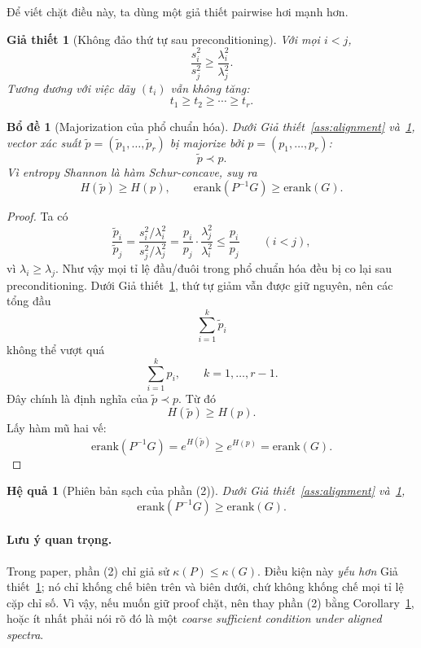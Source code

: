 \documentclass[11pt,a4paper]{article}
\newtheorem{lemma}{Bổ đề}
\newtheorem{assumption}{Giả thiết}
\newtheorem{corollary}{Hệ quả}
\newcommand{\erank}{\mathrm{erank}}
\begin{document}
\noindent
Để viết chặt điều này, ta dùng một giả thiết pairwise hơi mạnh hơn.

\begin{assumption}[Không đảo thứ tự sau preconditioning]
\label{ass:no-reorder}
Với mọi $i<j$,
\[
\frac{s_i^2}{s_j^2}\ge \frac{\lambda_i^2}{\lambda_j^2}.
\]
Tương đương với việc dãy $(t_i)$ vẫn không tăng:
\[
t_1\ge t_2\ge \cdots\ge t_r.
\]
\end{assumption}

\begin{lemma}[Majorization của phổ chuẩn hóa]
\label{lem:maj}
Dưới Giả thiết~\ref{ass:alignment} và~\ref{ass:no-reorder}, vector xác suất
$\tilde p=(\tilde p_1,\dots,\tilde p_r)$ bị majorize bởi $p=(p_1,\dots,p_r)$:
\[
\tilde p \prec p.
\]
Vì entropy Shannon là hàm Schur-concave, suy ra
\[
H(\tilde p)\ge H(p),
\qquad
\erank(P^{-1}G)\ge \erank(G).
\]
\end{lemma}

\begin{proof}
Ta có
\[
\frac{\tilde p_i}{\tilde p_j}
=
\frac{s_i^2/\lambda_i^2}{s_j^2/\lambda_j^2}
=
\frac{p_i}{p_j}\cdot \frac{\lambda_j^2}{\lambda_i^2}
\le
\frac{p_i}{p_j}
\qquad (i<j),
\]
vì $\lambda_i\ge \lambda_j$. Như vậy mọi tỉ lệ đầu/đuôi trong phổ chuẩn hóa đều bị co lại sau preconditioning. Dưới Giả thiết~\ref{ass:no-reorder}, thứ tự giảm vẫn được giữ nguyên, nên các tổng đầu
\[
\sum_{i=1}^k \tilde p_i
\]
không thể vượt quá
\[
\sum_{i=1}^k p_i,
\qquad k=1,\dots,r-1.
\]
Đây chính là định nghĩa của $\tilde p\prec p$. Từ đó
\[
H(\tilde p)\ge H(p).
\]
Lấy hàm mũ hai vế:
\[
\erank(P^{-1}G)=e^{H(\tilde p)}\ge e^{H(p)}=\erank(G).
\]
\end{proof}

\begin{corollary}[Phiên bản sạch của phần (2)]
\label{cor:part2}
Dưới Giả thiết~\ref{ass:alignment} và~\ref{ass:no-reorder},
\[
\erank(P^{-1}G)\ge \erank(G).
\]
\end{corollary}

\paragraph{Lưu ý quan trọng.}
Trong paper, phần (2) chỉ giả sử $\kappa(P)\le \kappa(G)$. Điều kiện này \emph{yếu hơn} Giả thiết~\ref{ass:no-reorder}; nó chỉ khống chế biên trên và biên dưới, chứ không khống chế mọi tỉ lệ cặp chỉ số. Vì vậy, nếu muốn giữ proof chặt, nên thay phần (2) bằng Corollary~\ref{cor:part2}, hoặc ít nhất phải nói rõ đó là một \emph{coarse sufficient condition under aligned spectra}.
\end{document}
